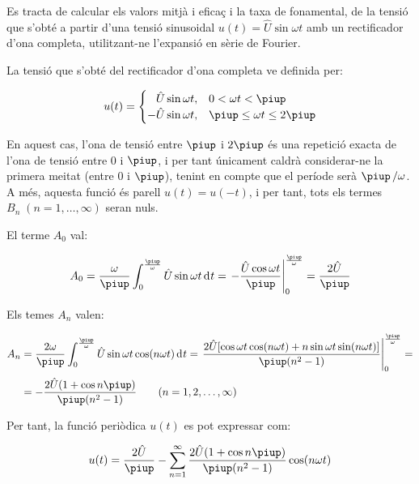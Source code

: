 \begin{exemple}
    Es tracta de calcular els valors mitjà i eficaç i la taxa de
    fonamental, de la tensió que s'obté a partir d'una tensió
    sinusoidal $u(t) = \hat{U} \sin\omega t$ amb un rectificador d'ona
    completa, utilitzant-ne l'expansió en sèrie de Fourier.

    La tensió que s'obté del rectificador d'ona completa ve definida
    per:

    \[
    u(t) = \begin{cases} \phantom{-}\hat{U} \sin\omega t, & 0 < \omega t < \piup\\
           -\hat{U} \sin\omega t, & \piup \leq \omega t \leq 2\piup \end{cases}
    \]

    En aquest cas, l'ona de tensió entre $\piup$ i $2\piup$ és una repetició
    exacta de l'ona de tensió entre 0 i $\piup$, i per tant únicament
    caldrà considerar-ne la primera meitat (entre 0 i $\piup$), tenint en
    compte que el període serà $\piup\,/\omega$. A més, aquesta funció és
    parell $u(t) = u(-t)$, i per tant, tots els termes
    $B_n\;(n=1,\ldots,\infty)$ seran nuls.

    El terme $A_0$ val:

    \[
    A_0 = \frac{\omega}{\piup} \int_0^{\frac{\piup}{\omega}} \hat{U} \sin
    \omega t \diff t = \left. -\frac{\hat{U} \cos \omega t}{\piup}
    \right|_0^{\frac{\piup}{\omega}} = \frac{2\hat{U}}{\piup}
    \]

    Els temes $A_n$ valen:

    \[
    \begin{split}
    A_n &= \frac{2 \omega}{\piup} \int_0^{\frac{\piup}{\omega}} \hat{U} \sin
    \omega t \cos(n \omega t)\diff t = \left. \frac{2 \hat{U}[ \cos
    \omega t \cos (n \omega t) + n \sin \omega t \sin(n \omega
    t)]}{\piup(n^2-1)} \right|_0^{\frac{\piup}{\omega}}=\\[0.5ex]
    &= -\frac{2\hat{U}(1+\cos n \piup)}{\piup(n^2-1)}
    \qquad(n=1,2,\ldots,\infty)
    \end{split}
    \]

    Per tant, la funció periòdica $u(t)$ es pot expressar com:

    \[
        u(t) = \frac{2\hat{U}}{\piup} - \sum_{n=1}^\infty
         \frac{2\hat{U}(1+\cos n \piup)}{\piup(n^2-1)} \cos(n \omega t)
    \]


\end{exemple}
